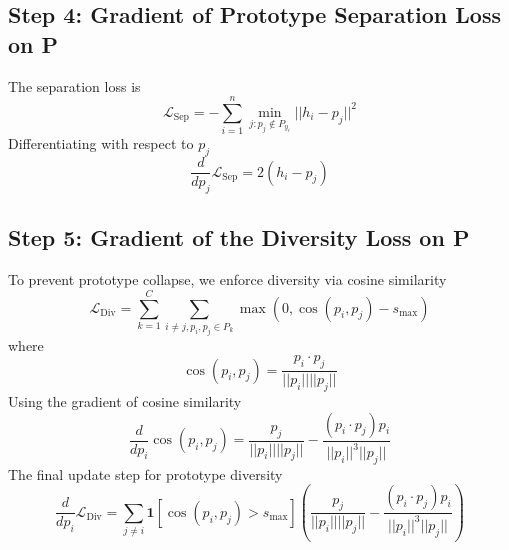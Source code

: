\documentclass[12pt]{article}
\begin{document}
\subsection*{Step 4: Gradient of Prototype Separation Loss  on P}
The separation loss is
\begin{equation*}
    \mathcal{L}_{\text{Sep}} = - \sum_{i=1}^{n} \min_{j:p_j \notin P_{y_i}} ||h_i - p_j||^2
\end{equation*}
Differentiating with respect to $p_j$
\begin{equation*}
    \frac{d}{dp_j} \mathcal{L}_{\text{Sep}} = 2(h_i - p_j)
\end{equation*}

\subsection*{Step 5: Gradient of the Diversity Loss  on P}
To prevent prototype collapse, we enforce diversity via cosine similarity
\begin{equation*}
    \mathcal{L}_{\text{Div}} = \sum_{k=1}^{C} \sum_{i \neq j, p_i, p_j \in P_k} \max(0, \cos(p_i, p_j) - s_{\max})
\end{equation*}
where
\begin{equation*}
    \cos(p_i, p_j) = \frac{p_i \cdot p_j}{||p_i|| ||p_j||}
\end{equation*}
Using the gradient of cosine similarity
\begin{equation*}
    \frac{d}{dp_i} \cos(p_i, p_j) = \frac{p_j}{||p_i|| ||p_j||} - \frac{(p_i \cdot p_j) p_i}{||p_i||^3 ||p_j||}
\end{equation*}
The final update step for prototype diversity
\begin{equation*}
    \frac{d}{dp_i} \mathcal{L}_{\text{Div}} = \sum_{j \neq i} \mathbf{1}[\cos(p_i, p_j) > s_{\max}] \left( \frac{p_j}{||p_i|| ||p_j||} - \frac{(p_i \cdot p_j) p_i}{||p_i||^3 ||p_j||} \right)
\end{equation*}
\end{document}
